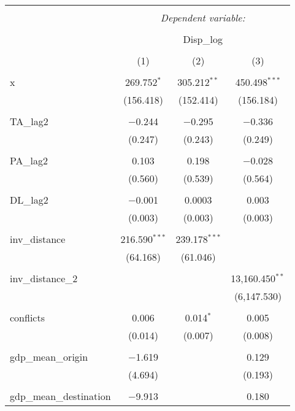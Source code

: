 
\begin{table}[!htbp] \centering 
  \caption{} 
  \label{} 
\begin{tabular}{@{\extracolsep{5pt}}lccc} 
\\[-1.8ex]\hline 
\hline \\[-1.8ex] 
 & \multicolumn{3}{c}{\textit{Dependent variable:}} \\ 
\cline{2-4} 
\\[-1.8ex] & \multicolumn{3}{c}{Disp\_log} \\ 
\\[-1.8ex] & (1) & (2) & (3)\\ 
\hline \\[-1.8ex] 
 x & 269.752$^{*}$ & 305.212$^{**}$ & 450.498$^{***}$ \\ 
  & (156.418) & (152.414) & (156.184) \\ 
  & & & \\ 
 TA\_lag2 & $-$0.244 & $-$0.295 & $-$0.336 \\ 
  & (0.247) & (0.243) & (0.249) \\ 
  & & & \\ 
 PA\_lag2 & 0.103 & 0.198 & $-$0.028 \\ 
  & (0.560) & (0.539) & (0.564) \\ 
  & & & \\ 
 DL\_lag2 & $-$0.001 & 0.0003 & 0.003 \\ 
  & (0.003) & (0.003) & (0.003) \\ 
  & & & \\ 
 inv\_distance & 216.590$^{***}$ & 239.178$^{***}$ &  \\ 
  & (64.168) & (61.046) &  \\ 
  & & & \\ 
 inv\_distance\_2 &  &  & 13,160.450$^{**}$ \\ 
  &  &  & (6,147.530) \\ 
  & & & \\ 
 conflicts & 0.006 & 0.014$^{*}$ & 0.005 \\ 
  & (0.014) & (0.007) & (0.008) \\ 
  & & & \\ 
 gdp\_mean\_origin & $-$1.619 &  & 0.129 \\ 
  & (4.694) &  & (0.193) \\ 
  & & & \\ 
 gdp\_mean\_destination & $-$9.913 &  & 0.180 \\ 

\end{tabular}
\end{table}
